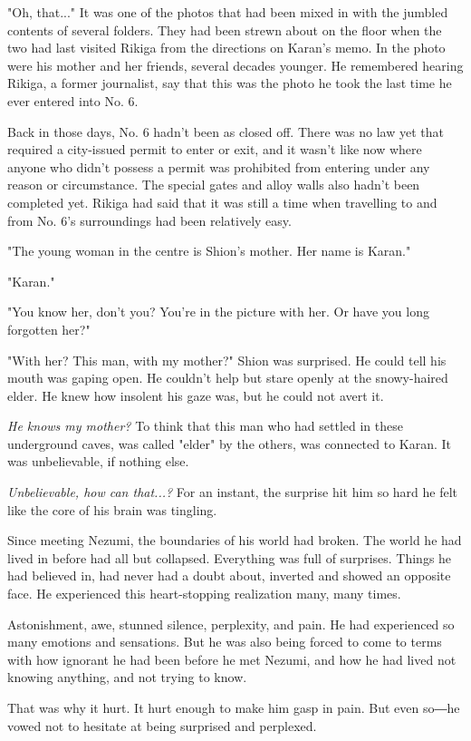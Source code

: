 "Oh, that..." It was one of the photos that had been mixed in with the
jumbled contents of several folders. They had been strewn about on the
floor when the two had last visited Rikiga from the directions on
Karan's memo. In the photo were his mother and her friends, several
decades younger. He remembered hearing Rikiga, a former journalist, say
that this was the photo he took the last time he ever entered into No.
6.

Back in those days, No. 6 hadn't been as closed off. There was no law
yet that required a city-issued permit to enter or exit, and it wasn't
like now where anyone who didn't possess a permit was prohibited from
entering under any reason or circumstance. The special gates and alloy
walls also hadn't been completed yet. Rikiga had said that it was still
a time when travelling to and from No. 6's surroundings had been
relatively easy.

"The young woman in the centre is Shion's mother. Her name is Karan."

"Karan."

"You know her, don't you? You're in the picture with her. Or have you
long forgotten her?"

"With her? This man, with my mother?" Shion was surprised. He could tell
his mouth was gaping open. He couldn't help but stare openly at the
snowy-haired elder. He knew how insolent his gaze was, but he could not
avert it.

\emph{He knows my mother?} To think that this man who had settled in these
underground caves, was called "elder" by the others, was connected to
Karan. It was unbelievable, if nothing else.

\emph{Unbelievable, how can that...?} For an instant, the surprise hit him so
hard he felt like the core of his brain was tingling.

Since meeting Nezumi, the boundaries of his world had broken. The world
he had lived in before had all but collapsed. Everything was full of
surprises. Things he had believed in, had never had a doubt about,
inverted and showed an opposite face. He experienced this heart-stopping
realization many, many times.

Astonishment, awe, stunned silence, perplexity, and pain. He had
experienced so many emotions and sensations. But he was also being
forced to come to terms with how ignorant he had been before he met
Nezumi, and how he had lived not knowing anything, and not trying to
know.

That was why it hurt. It hurt enough to make him gasp in pain. But even
so―he vowed not to hesitate at being surprised and perplexed.

